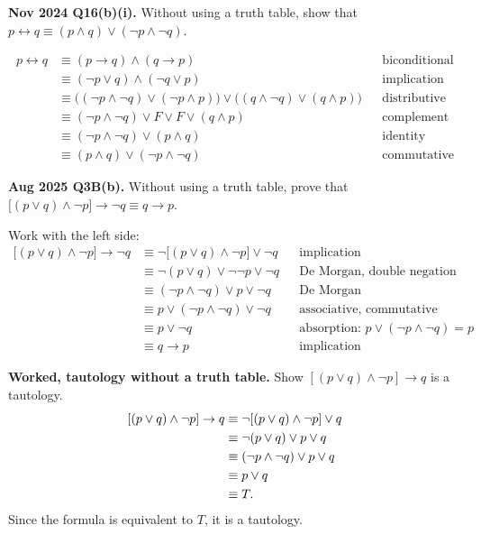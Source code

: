 \documentclass[11pt,a4paper]{article}
\begin{document}
\begin{pyqbox}
\textbf{Nov 2024 Q16(b)(i).} Without using a truth table, show that $p\leftrightarrow q\equiv(p\land q)\lor(\neg p\land\neg q)$.
\end{pyqbox}

\begin{solbox}
\[
\begin{aligned}
p\leftrightarrow q
&\equiv (p\to q)\land(q\to p) && \text{biconditional}\\
&\equiv (\neg p\lor q)\land(\neg q\lor p) && \text{implication}\\
&\equiv \bigl((\neg p\land\neg q)\lor(\neg p\land p)\bigr)\lor\bigl((q\land\neg q)\lor(q\land p)\bigr) && \text{distributive}\\
&\equiv (\neg p\land\neg q)\lor F\lor F\lor(q\land p) && \text{complement}\\
&\equiv (\neg p\land\neg q)\lor(p\land q) && \text{identity}\\
&\equiv (p\land q)\lor(\neg p\land\neg q) && \text{commutative}
\end{aligned}
\]
\end{solbox}

\begin{pyqbox}
\textbf{Aug 2025 Q3B(b).} Without using a truth table, prove that $\bigl[(p\lor q)\land\neg p\bigr]\to\neg q\equiv q\to p$.
\end{pyqbox}

\begin{solbox}
Work with the left side:
\[
\begin{aligned}
\bigl[(p\lor q)\land\neg p\bigr]\to\neg q
&\equiv \neg\bigl[(p\lor q)\land\neg p\bigr]\lor\neg q && \text{implication}\\
&\equiv \neg(p\lor q)\lor\neg\neg p\lor\neg q && \text{De Morgan, double negation}\\
&\equiv (\neg p\land\neg q)\lor p\lor\neg q && \text{De Morgan}\\
&\equiv p\lor(\neg p\land\neg q)\lor\neg q && \text{associative, commutative}\\
&\equiv p\lor\neg q && \text{absorption: }p\lor(\neg p\land\neg q)=p\\
&\equiv q\to p && \text{implication}
\end{aligned}
\]
\end{solbox}

\begin{exambox}
\textbf{Worked, tautology without a truth table.} Show $[(p\lor q)\land\neg p]\to q$ is a tautology.
\[
\begin{aligned}
\relax[(p\lor q)\land\neg p]\to q
&\equiv \neg[(p\lor q)\land\neg p]\lor q\\
&\equiv \neg(p\lor q)\lor p\lor q\\
&\equiv (\neg p\land\neg q)\lor p\lor q\\
&\equiv p\lor q\\
&\equiv T.
\end{aligned}
\]
Since the formula is equivalent to $T$, it is a tautology.
\end{exambox}
\end{document}
